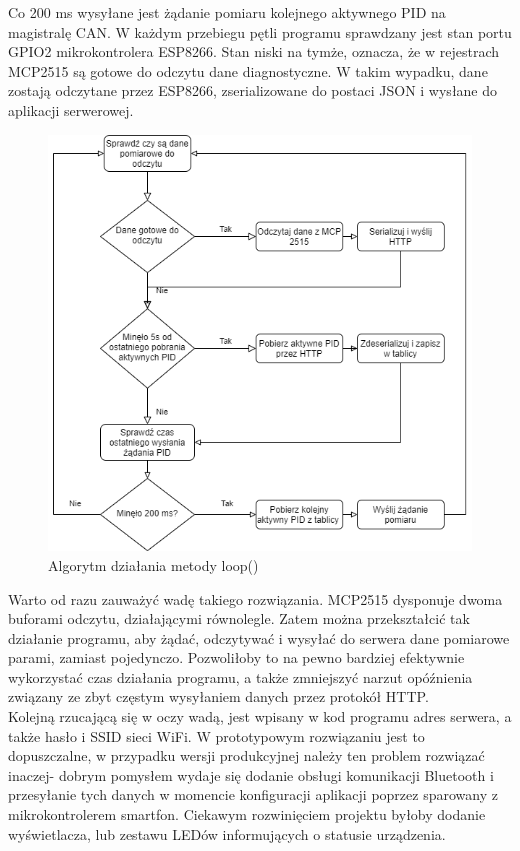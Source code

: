 \documentclass[10pt,a4paper]{article}
\begin{document}
		Co 200 ms wysyłane jest żądanie pomiaru kolejnego aktywnego PID na magistralę CAN. W każdym przebiegu pętli programu sprawdzany jest stan portu GPIO2 mikrokontrolera ESP8266. Stan niski na tymże, oznacza, że w rejestrach MCP2515 są gotowe do odczytu dane diagnostyczne. W takim wypadku, dane zostają odczytane przez ESP8266, zserializowane do postaci JSON i wysłane do aplikacji serwerowej.
		\begin{figure}[H]
			\centering
			\includegraphics[width=0.5\linewidth]{main_loop.drawio}
			\caption[Algorytm działania metody loop()]{Algorytm działania metody loop()}
			\label{fig:mainloop}
		\end{figure}
		Warto od razu zauważyć wadę takiego rozwiązania. MCP2515 dysponuje dwoma buforami odczytu, działającymi równolegle. Zatem można przekształcić tak działanie programu, aby żądać, odczytywać i wysyłać do serwera dane pomiarowe parami, zamiast pojedynczo. Pozwoliłoby to na pewno bardziej efektywnie wykorzystać czas działania programu, a także zmniejszyć narzut opóźnienia związany ze zbyt częstym wysyłaniem danych przez protokół HTTP.\\
		Kolejną rzucającą się w oczy wadą, jest wpisany w kod programu adres serwera, a także hasło i SSID sieci WiFi. W prototypowym rozwiązaniu jest to dopuszczalne, w przypadku wersji produkcyjnej należy ten problem rozwiązać inaczej- dobrym pomysłem wydaje się dodanie obsługi komunikacji Bluetooth i przesyłanie tych danych w momencie konfiguracji aplikacji poprzez sparowany z mikrokontrolerem smartfon. Ciekawym rozwinięciem projektu byłoby dodanie wyświetlacza, lub zestawu LEDów informujących o statusie urządzenia.
		
\end{document}

